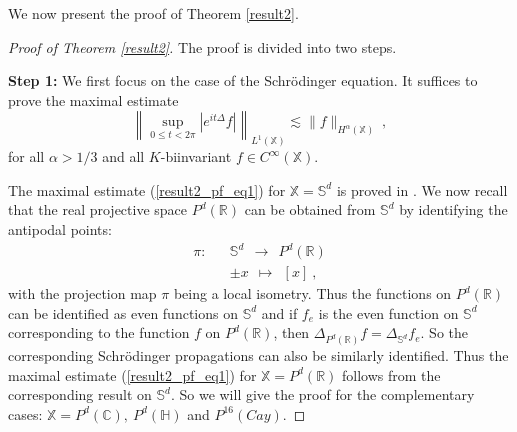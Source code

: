 \documentclass[12pt]{amsart}
\theoremstyle{definition}
\newcommand{\R}{\mathbb R}%
\newcommand{\C}{\mathbb C}%
\newcommand{\Sb}{\mathbb S}%
\newcommand{\X}{\mathbb X}%
\newcommand{\Hb}{\mathbb H}%
\numberwithin{equation}{section}
\begin{document}
We now present the proof of Theorem \ref{result2}.
\begin{proof}[Proof of Theorem \ref{result2}]
The proof is divided into two steps.

{\bf Step 1:} We first focus on the case of the Schr\"odinger equation. It suffices to prove the maximal estimate
\begin{equation} \label{result2_pf_eq1}
\left\|\sup_{0 \le t < 2\pi} \left|e^{it\Delta} f \right|\right\|_{L^1(\X)} \lesssim \|f\|_{H^\alpha(\X)}\:,
\end{equation}
for all $\alpha >1/3$ and all $K$-biinvariant $f \in C^\infty(\X)$.

The maximal estimate (\ref{result2_pf_eq1}) for $\X=\Sb^d$ is proved in \cite[Theorem 1.3]{CDLY}. We now recall that the real projective space $P^d(\R)$ can be obtained from $\Sb^d$ by identifying the antipodal points:
\begin{eqnarray*}
\pi : &&\Sb^d\:\: \to \:\: P^d(\R) \\
&& \pm x \:\:\mapsto \:\: [x]\:,
\end{eqnarray*}
with the projection map $\pi$ being a local isometry.  Thus the functions on $P^d(\R)$ can be identified as even functions on $\Sb^d$ and if $f_e$ is the even function on $\Sb^d$ corresponding to the function $f$ on $P^d(\R)$, then $\Delta_{P^d(\R)} f=\Delta_{\Sb^d}f_e$. So the corresponding Schr\"odinger propagations can also be similarly identified. Thus the maximal estimate (\ref{result2_pf_eq1}) for $\X=P^d(\R)$ follows from the corresponding result on $\Sb^d$. So we will give the proof for the complementary cases: $\X=P^d(\C),\:P^d(\Hb)$ and $P^{16}(Cay)$.


\end{proof}
\end{document}
